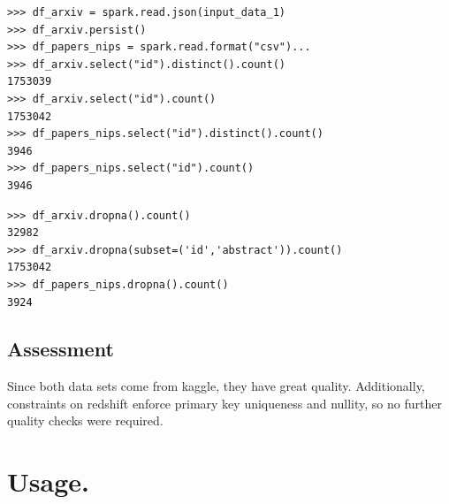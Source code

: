 \begin{mdframed}[backgroundcolor=light-gray, roundcorner=10pt,leftmargin=1, rightmargin=1, innerleftmargin=15, innertopmargin=15,innerbottommargin=15, outerlinewidth=1, linecolor=light-gray]
\begin{lstlisting}[caption={Volume and Uniqueness},label={vol}]  
>>> df_arxiv = spark.read.json(input_data_1)
>>> df_arxiv.persist()
>>> df_papers_nips = spark.read.format("csv")...
>>> df_arxiv.select("id").distinct().count()
1753039                                                                         
>>> df_arxiv.select("id").count()
1753042                                                                         
>>> df_papers_nips.select("id").distinct().count()
3946
>>> df_papers_nips.select("id").count()
3946
\end{lstlisting}
\end{mdframed} 

\begin{mdframed}[backgroundcolor=light-gray, roundcorner=10pt,leftmargin=1, rightmargin=1, innerleftmargin=15, innertopmargin=15,innerbottommargin=15, outerlinewidth=1, linecolor=light-gray]
\begin{lstlisting}[caption={Completeness of the Datastsets},label={completeness}]  
>>> df_arxiv.dropna().count()
32982                                                                           
>>> df_arxiv.dropna(subset=('id','abstract')).count()
1753042                                                                         
>>> df_papers_nips.dropna().count()
3924
\end{lstlisting}
\end{mdframed} 

\subsection{Assessment}
Since both data sets come from kaggle, they have great quality. Additionally, constraints on redshift enforce primary key uniqueness and nullity, so
no further quality checks were required.

\section{Usage.}











